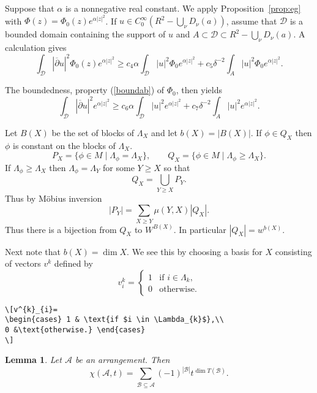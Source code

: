 \documentclass{article}
\newtheorem{lem}[thm]{Lemma}
\theoremstyle{definition}
\theoremstyle{remark}
\newcommand{\A}{\mathcal{A}}
\newcommand{\BB}{\mathcal{B}}
\newcommand{\envert}[1]{\left\lvert#1\right\rvert}
\let\abs=\envert
\begin{document}
Suppose that $\alpha$ is a nonnegative real constant. We apply
Proposition~\ref{prop:eg} with $\Phi(z)=\Phi_ 0(z) e^{\alpha\abs{z}^2}$. If
$u\in C^\infty_0(R^2-\bigcup_\nu D_\nu(a))$, assume that $\mathcal{D}$
is a bounded domain containing the support of $u$ and $A\subset
\mathcal{D}\subset R^2-\bigcup_\nu D_\nu(a)$. A calculation gives
\[\int_{\mathcal{D}}\abs{\overline\partial u}^2\Phi_ 0(z) e^{\alpha\abs{z}^2}
\geq c_4\alpha\int_{\mathcal{D}}\abs{u}^2\Phi_ 0e^{\alpha\abs{z}^2}
+c_5\delta^{-2}\int_ A\abs{u}^2\Phi_ 0e^{\alpha\abs{z}^2}.\]

The boundedness, property (\ref{boundab}) of $\Phi_ 0$, then yields
\[\int_{\mathcal{D}}\abs{\overline\partial u}^2e^{\alpha\abs{z}^2}\geq c_6\alpha
\int_{\mathcal{D}}\abs{u}^2e^{\alpha\abs{z}^2}
+c_7\delta^{-2}\int_ A\abs{u}^2e^{\alpha\abs{z}^2}.\]

Let $B(X)$ be the set of blocks of $\Lambda_{X}$
and let $b(X) = \abs{B(X)}$. If $\phi \in Q_{X}$ then
$\phi$ is constant on the blocks of $\Lambda_{X}$.
\begin{equation}\label{far-d}
 P_{X} = \{ \phi \in M \mid \Lambda_{\phi} = \Lambda_{X} \},
\qquad
Q_{X} = \{\phi \in M \mid \Lambda_{\phi} \geq \Lambda_{X} \}.
\end{equation}
If $\Lambda_{\phi} \geq \Lambda_{X}$ then
$\Lambda_{\phi} = \Lambda_{Y}$ for some $Y \geq X$ so that
\[ Q_{X} = \bigcup_{Y \geq X} P_{Y}. \]
Thus by M\"obius inversion
\[ \abs{P_{Y}}= \sum_{X\geq Y} \mu (Y,X)\abs{Q_{X}}.\]
Thus there is a bijection from $Q_{X}$ to $W^{B(X)}$.
In particular $\abs{Q_{X}} = w^{b(X)}$.

Next note that $b(X)=\dim X$. We see this by choosing a
basis for $X$ consisting of vectors $v^{k}$ defined by
\[v^{k}_{i}=
\begin{cases} 1 & \text{if $i \in \Lambda_{k}$},\\
0 &\text{otherwise.} \end{cases}
\]
\begin{verbatim}
\[v^{k}_{i}=
\begin{cases} 1 & \text{if $i \in \Lambda_{k}$},\\
0 &\text{otherwise.} \end{cases}
\]
\end{verbatim}

\begin{lem}\label{p0201}
Let $\A$ be an arrangement. Then
\[ \chi (\A,t) = \sum_{\BB \subseteq \A}
(-1)^{\abs{\BB}} t^{\dim T(\BB)}. \]
\end{lem}
\end{document}
